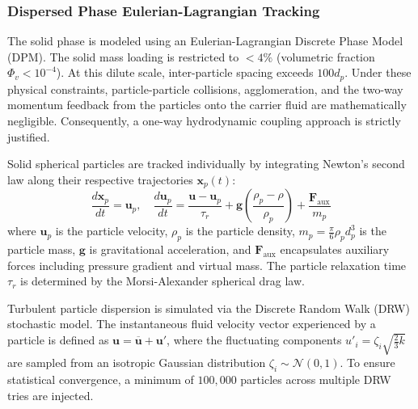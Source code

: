 \documentclass{article}
\begin{document}
\subsubsection{Dispersed Phase Eulerian-Lagrangian Tracking}
The solid phase is modeled using an Eulerian-Lagrangian Discrete Phase Model (DPM). The solid mass loading is restricted to $<4\%$ (volumetric fraction $\Phi_v < 10^{-4}$). At this dilute scale, inter-particle spacing exceeds $100 d_p$. Under these physical constraints, particle-particle collisions, agglomeration, and the two-way momentum feedback from the particles onto the carrier fluid are mathematically negligible. Consequently, a one-way hydrodynamic coupling approach is strictly justified.

Solid spherical particles are tracked individually by integrating Newton's second law along their respective trajectories $\mathbf{x}_p(t)$:
\begin{equation}
    \frac{d \mathbf{x}_p}{dt} = \mathbf{u}_p, \quad \frac{d \mathbf{u}_p}{dt} = \frac{\mathbf{u} - \mathbf{u}_p}{\tau_r} + \mathbf{g} \left( \frac{\rho_p - \rho}{\rho_p} \right) + \frac{\mathbf{F}_{\text{aux}}}{m_p}
    \label{eq:particle_motion}
\end{equation}
where $\mathbf{u}_p$ is the particle velocity, $\rho_p$ is the particle density, $m_p = \frac{\pi}{6}\rho_p d_p^3$ is the particle mass, $\mathbf{g}$ is gravitational acceleration, and $\mathbf{F}_{\text{aux}}$ encapsulates auxiliary forces including pressure gradient and virtual mass. The particle relaxation time $\tau_r$ is determined by the Morsi-Alexander spherical drag law.

Turbulent particle dispersion is simulated via the Discrete Random Walk (DRW) stochastic model. The instantaneous fluid velocity vector experienced by a particle is defined as $\mathbf{u} = \overline{\mathbf{u}} + \mathbf{u}'$, where the fluctuating components $u'_i = \zeta_i \sqrt{\frac{2}{3}k}$ are sampled from an isotropic Gaussian distribution $\zeta_i \sim \mathcal{N}(0,1)$. To ensure statistical convergence, a minimum of $100,000$ particles across multiple DRW tries are injected.
\end{document}
